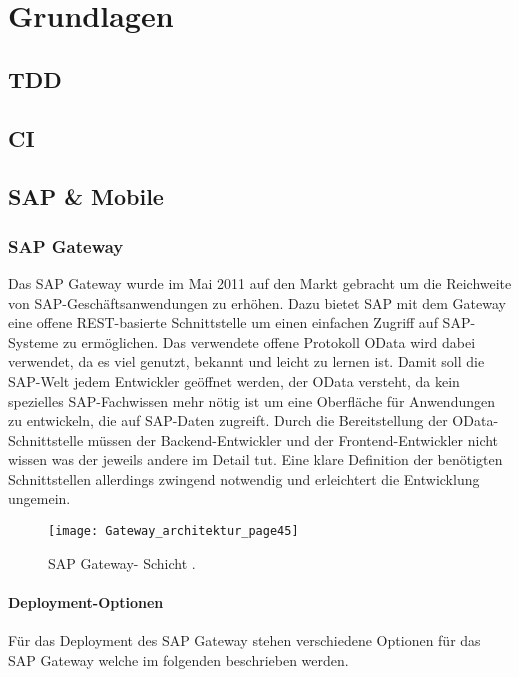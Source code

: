 \chapter{Grundlagen}
\label{cha:Grundlagen}

\section{TDD}
\section{CI}
\section{SAP \& Mobile}

\subsection{SAP Gateway}
Das SAP Gateway wurde im Mai 2011 auf den Markt gebracht um die Reichweite von SAP-Geschäftsanwendungen zu erhöhen. 
Dazu bietet SAP mit dem Gateway eine offene REST-basierte Schnittstelle um einen einfachen Zugriff auf SAP-Systeme zu ermöglichen.
Das verwendete offene Protokoll OData wird dabei verwendet, da es viel genutzt, bekannt und leicht zu lernen ist. Damit soll die SAP-Welt jedem Entwickler geöffnet werden, der OData versteht, da kein spezielles SAP-Fachwissen mehr nötig ist um eine Oberfläche für Anwendungen zu entwickeln, die auf SAP-Daten zugreift.
Durch die Bereitstellung der OData-Schnittstelle müssen der Backend-Entwickler und der Frontend-Entwickler nicht wissen was der jeweils andere im Detail tut. Eine klare Definition der benötigten Schnittstellen allerdings zwingend notwendig und erleichtert die Entwicklung ungemein\cite[S.\ 31-45]{BoennenDreesFischerHeinzStrothmann2014}.

\begin{figure}[h]
\centering
\texttt{[image: Gateway\_architektur\_page45]} 
\caption{SAP Gateway- Schicht \cite[S.\ 45]{BoennenDreesFischerHeinzStrothmann2014}.}
\label{fig:CocaCola}
\end{figure}


\subsubsection{Deployment-Optionen}
Für das Deployment des SAP Gateway stehen verschiedene Optionen für das SAP Gateway welche im folgenden beschrieben werden.


